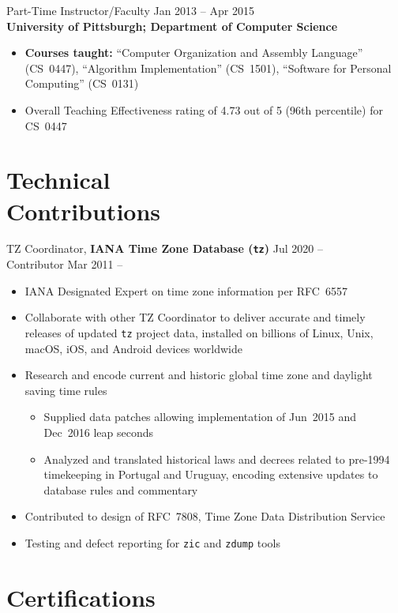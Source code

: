 \documentclass[11pt]{article}
\newcommand{\textdb}[1]{\fontseries{db}\selectfont#1\normalfont}
\newcommand{\present}{\phantom{Xxx 20XX}}
\begin{document}
\textdb{
Part-Time Instructor/Faculty
	\hfill Jan 2013 -- Apr 2015 \\
}
\textbf{University of Pittsburgh; Department of Computer Science}
\begin{itemize}
	\item \textbf{Courses taught:}
		``Computer Organization and Assembly Language'' (CS~0447),
		``Algorithm Implementation'' (CS~1501),
		``Software for Personal Computing'' (CS~0131)
	\item Overall Teaching Effectiveness rating of 4.73 out of 5
		(96th percentile) for CS~0447
\end{itemize}



\section{Technical\\ Contributions}

\textdb{
TZ Coordinator,
\textbf{IANA Time Zone Database (\texttt{tz})}
	\hfill Jul 2020 -- \present \\
}
\textdb{
Contributor
	\hfill Mar 2011 -- \present
}
\begin{itemize}
	\item IANA Designated Expert on time zone information per RFC~6557
	\item Collaborate with other TZ Coordinator to deliver accurate and timely releases
		of updated \texttt{tz} project data,
		installed on billions of Linux, Unix, macOS, iOS, and Android devices worldwide
	\item Research and encode current and historic global time zone and daylight saving time rules
		\begin{itemize}
			\item Supplied data patches allowing implementation of
				Jun~2015 and Dec~2016 leap seconds
			\item Analyzed and translated historical laws and decrees
				related to pre-1994 timekeeping in Portugal and Uruguay,
				encoding extensive updates to database rules and commentary
		\end{itemize}
	\item Contributed to design of RFC~7808, Time Zone Data Distribution Service
	\item Testing and defect reporting for \texttt{zic} and \texttt{zdump} tools
\end{itemize}



\section{Certifications}
\end{document}
